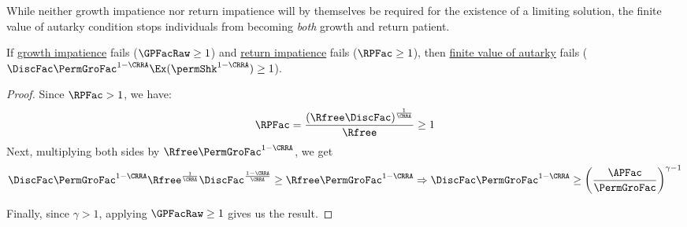 \documentclass[BufferStockTheory]{subfiles}
\begin{document}
\begin{comment}
below stuff goes in growth section.
Strong growth impatience guarantees that the \textit{expectation} of normalized market resources becomes less than one market resources limit to infinity, since the condition will imply $\min \{\Ex\frac{\APFac}{\Rnd{\PermGroFac}}, \Ex\frac{R}{\Rnd{\PermGroFac}}\}< \GPFacMod<1$.


The growth impatience condition relates the \textit{expected} growth factor of permanent income to the \hyperlink{APFAC}{absolute patience factor}.
Following the discussion below Assumption \ref{ass:RIC}, the growth factor of the ratio of expected market resources to expected permanent income as $m$ limits to infinity becomes $\min \{\frac{\APFac}{\PermGroFac}, \frac{R}{\PermGroFac}\}$, and we have $\min \{\frac{\APFac}{\PermGroFac}, \frac{R}{\PermGroFac}\}< \GPFacRaw$.
Thus, growth impatience ensures the ratio of \textit{expected} market resources to \textit{expected} permanent income eventually falls as $\mNrm$ grows.
\end{comment}

While neither growth impatience nor return impatience will by themselves be required for the existence of a limiting solution, the finite value of autarky condition stops individuals from becoming \textit{both} growth and return patient.


\begin{claim}\label{claim:noRICGIC}
If \hyperlink{GIC}{growth impatience} fails ($\GPFacRaw  \geq 1$) and \hyperlink{RIC}{return impatience} fails ($\RPFac \geq 1$), then \hyperlink{FVAC}{finite value of autarky} fails ($\DiscFac \PermGroFac^{1-\CRRA}\Ex(\permShk^{1-\CRRA})\geq 1$). 
\end{claim}

\begin{proof}
Since $\RPFac  > 1$, we have:
%
%
\begin{equation}
\RPFac = \frac{\left(\Rfree\DiscFac\right)^{\frac{1}{\CRRA}}}{\Rfree}\geq 1
\end{equation}
%
Next, multiplying both sides by $\Rfree\PermGroFac^{1-\CRRA}$, we get
%
\begin{equation}
\DiscFac\PermGroFac^{1-\CRRA}\Rfree^{\frac{1}{\CRRA}}\DiscFac^{\frac{1-\CRRA}{\CRRA}}{}\geq\Rfree \PermGroFac^{1-\CRRA} \Rightarrow \DiscFac\PermGroFac^{1-\CRRA}\geq\left(\frac{\APFac}{\PermGroFac}\right)^{\gamma-1}
\end{equation}
%

Finally, since $\gamma>1$, applying $\GPFacRaw  \geq 1$ gives us the result.


\end{proof}
\end{document}
